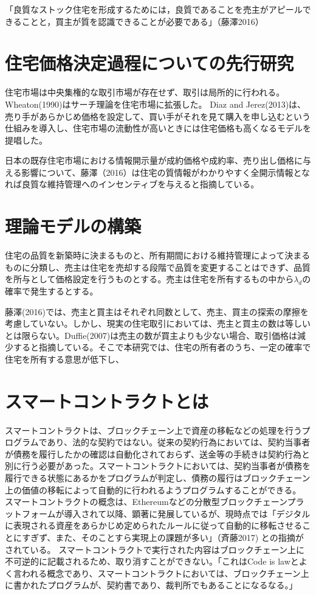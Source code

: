 \documentclass[a4paper,fontsize=11pt,report,notitlepage,line_length=38zw,number_of_lines=40]{jlreq}
\begin{document}
「良質なストック住宅を形成するためには，良質であることを売主がアピールできることと，買主が質を認識できることが必要である」（藤澤2016）%


\chapter{住宅価格決定過程についての先行研究}
住宅市場は中央集権的な取引市場が存在せず、取引は局所的に行われる。
Wheaton(1990)はサーチ理論を住宅市場に拡張した。
Diaz and Jerez(2013)は、売り手があらかじめ価格を設定して、買い手がそれを見て購入を申し込むという仕組みを導入し、住宅市場の流動性が高いときには住宅価格も高くなるモデルを提唱した。

日本の既存住宅市場における情報開示量が成約価格や成約率、売り出し価格に与える影響について、藤澤（2016）は住宅の質情報がわかりやすく全開示情報となれば良質な維持管理へのインセンティブを与えると指摘している。

\chapter{理論モデルの構築}
住宅の品質を新築時に決まるものと、所有期間における維持管理によって決まるものに分類し、売主は住宅を売却する段階で品質を変更することはできず、品質を所与として価格設定を行うものとする。売主は住宅を所有するもの中から$\lambda_{d}$の確率で発生するとする。

藤澤(2016)では、売主と買主はそれぞれ同数として、売主、買主の探索の摩擦を考慮していない。しかし、現実の住宅取引においては、売主と買主の数は等しいとは限らない。Duffie(2007)は売主の数が買主よりも少ない場合、取引価格は減少すると指摘している。そこで本研究では、住宅の所有者のうち、一定の確率で住宅を所有する意思が低下し、

\chapter{スマートコントラクトとは}
スマートコントラクトは、ブロックチェーン上で資産の移転などの処理を行うプログラムであり、法的な契約ではない。従来の契約行為においては、契約当事者が債務を履行したかの確認は自動化されておらず、送金等の手続きは契約行為と別に行う必要があった。スマートコントラクトにおいては、契約当事者が債務を履行できる状態にあるかをプログラムが判定し、債務の履行はブロックチェーン上の価値の移転によって自動的に行われるようプログラムすることができる。
スマートコントラクトの概念は、Ethereumなどの分散型ブロックチェーンプラットフォームが導入されて以降、顕著に発展しているが、現時点では「デジタルに表現される資産をあらかじめ定められたルールに従って自動的に移転させることにすぎず、また、そのことすら実現上の課題が多い」（斉藤2017)
との指摘がされている。
スマートコントラクトで実行された内容はブロックチェーン上に不可逆的に記載されるため、取り消すことができない。「これはCode is lawとよく言われる概念であり、スマートコントラクトにおいては、ブロックチェーン上に書かれたプログラムが、契約書であり、裁判所でもあることになるなる。」
\end{document}
